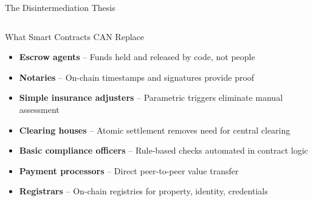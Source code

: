 \documentclass[8pt,aspectratio=169]{beamer}
\begin{document}
\begin{frame}{The Disintermediation Thesis}
\begin{columns}[T]
\begin{exampleblock}{What Smart Contracts CAN Replace}
\footnotesize
\begin{itemize}
  \item \textcolor{mlgreen}{\textbf{Escrow agents}} -- Funds held and released by code, not people
  \item \textcolor{mlgreen}{\textbf{Notaries}} -- On-chain timestamps and signatures provide proof
  \item \textcolor{mlgreen}{\textbf{Simple insurance adjusters}} -- Parametric triggers eliminate manual assessment
  \item \textcolor{mlgreen}{\textbf{Clearing houses}} -- Atomic settlement removes need for central clearing
  \item \textcolor{mlgreen}{\textbf{Basic compliance officers}} -- Rule-based checks automated in contract logic
  \item \textcolor{mlgreen}{\textbf{Payment processors}} -- Direct peer-to-peer value transfer
  \item \textcolor{mlgreen}{\textbf{Registrars}} -- On-chain registries for property, identity, credentials
\end{itemize}
\end{exampleblock}


\end{columns}
\end{frame}
\end{document}
